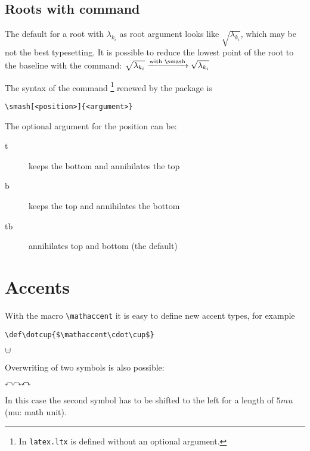 \begin{table}[htb]
\subsection{Roots with  command}

The default for a root with $\lambda_{k_{i}}$ as root
argument looks like $\sqrt{\lambda_{k_{i}}}$, which may be not the    %
best typesetting. It is possible to reduce the lowest point of the root
to the baseline with the  command: $\sqrt{\lambda_{k_{i}}}\xrightarrow{\text{with \textbackslash smash}}\sqrt{\smash[b]{\lambda_{k_{i}}}}$


The syntax of the  command%
\footnote{In \texttt{latex.ltx}  is defined without an optional argument.} renewed by the \AmSmath  package is    %

\begin{lstlisting}
\smash[<position>]{<argument>}
\end{lstlisting}
The optional argument for the position can be:

\begin{description}
\item [t]keeps the bottom and annihilates the top
\item [b]keeps the top and annihilates the bottom
\item [tb]annihilates top and bottom (the default)
\end{description}

\section{Accents}\label{amssymb}

With the macro \verb|\mathaccent| it is easy to define new accent types, for example

\begin{lstlisting}
\def\dotcup{$\mathaccent\cdot\cup$}
\end{lstlisting}

$\mathaccent\cdot\cup$

\def\curvearrowleftright{%
	\ensuremath{%
		\mathaccent\curvearrowright{\mkern-5mu\curvearrowleft}%
	}%
}

Overwriting of two symbols is also possible:

{\huge
$\curvearrowleft\curvearrowright\curvearrowleftright$}

In this case the second symbol has to be shifted to the left for a length    %
of $5mu$ (mu: math unit).


\end{table}
